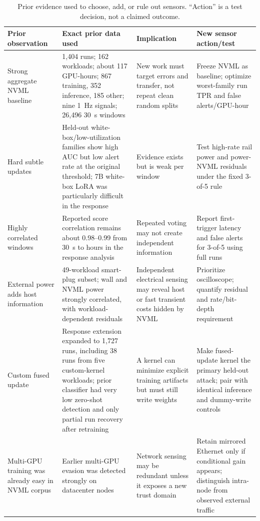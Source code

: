 \documentclass[sigplan,anonymous,review,nonacm]{acmart}
\begin{document}
\begin{table}[H]
\centering
\caption{Prior evidence used to choose, add, or rule out sensors. ``Action'' is a test decision, not a claimed outcome.}
\label{tab:prior-map}
\small
\begin{tabularx}{\textwidth}{p{3.0cm}p{3.2cm}Xp{3.7cm}}
\toprule
Prior observation & Exact prior data used & Implication & New sensor action/test \\
\midrule
Strong aggregate NVML baseline & 1,404 runs; 162 workloads; about 117 GPU-hours; 867 training, 352 inference, 185 other; nine 1~Hz signals; 26,496 30~s windows & New work must target errors and transfer, not repeat clean random splits & Freeze NVML as baseline; optimize worst-family run TPR and false alerts/GPU-hour \\
Hard subtle updates & Held-out white-box/low-utilization families show high AUC but low alert rate at the original threshold; 7B white-box LoRA was particularly difficult in the response & Evidence exists but is weak per window & Test high-rate rail power and power-NVML residuals under the fixed 3-of-5 rule \\
Highly correlated windows & Reported score correlation remains about 0.98--0.99 from 30~s to hours in the response analysis & Repeated voting may not create independent information & Report first-trigger latency and false alerts for 3-of-5 using full runs \\
External power adds host information & 49-workload smart-plug subset; wall and NVML power strongly correlated, with workload-dependent residuals & Independent electrical sensing may reveal host or fast transient costs hidden by NVML & Prioritize oscilloscope; quantify residual and rate/bit-depth requirement \\
Custom fused update & Response extension expanded to 1,727 runs, including 38 runs from five custom-kernel workloads; prior classifier had very low zero-shot detection and only partial run recovery after retraining & A kernel can minimize explicit training artifacts but must still write weights & Make fused-update kernel the primary held-out attack; pair with identical inference and dummy-write controls \\
Multi-GPU training was already easy in NVML corpus & Earlier multi-GPU evasion was detected strongly on datacenter nodes & Network sensing may be redundant unless it exposes a new trust domain & Retain mirrored Ethernet only if conditional gain appears; distinguish intra-node from observed external traffic \\

\end{tabularx}
\end{table}
\end{document}
